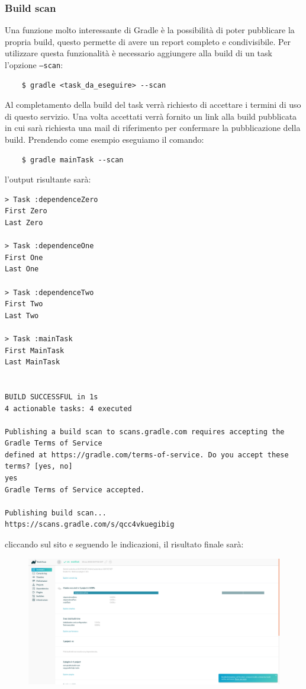 \subsubsection{Build scan}
Una funzione molto interessante di Gradle è la possibilità di poter pubblicare la propria build, questo permette di avere un report completo e condivisibile. Per utilizzare questa funzionalità è necessario aggiungere alla build di un task l'opzione \texttt{--scan}:
\begin{verbatim}    $ gradle <task_da_eseguire> --scan \end{verbatim}
Al completamento della build del task verrà richiesto di accettare i termini di uso di questo servizio. Una volta accettati verrà fornito un link alla build pubblicata in cui sarà richiesta una mail di riferimento per confermare la pubblicazione della build. Prendendo come esempio eseguiamo il comando:
\begin{verbatim}
    $ gradle mainTask --scan\end{verbatim}
l'output risultante sarà:
\begin{verbatim}
> Task :dependenceZero 
First Zero
Last Zero

> Task :dependenceOne 
First One
Last One

> Task :dependenceTwo 
First Two
Last Two

> Task :mainTask 
First MainTask
Last MainTask


BUILD SUCCESSFUL in 1s
4 actionable tasks: 4 executed

Publishing a build scan to scans.gradle.com requires accepting the Gradle Terms of Service 
defined at https://gradle.com/terms-of-service. Do you accept these terms? [yes, no] 
yes
Gradle Terms of Service accepted.

Publishing build scan...
https://scans.gradle.com/s/qcc4vkuegibig
\end{verbatim}
cliccando sul sito e seguendo le indicazioni, il risultato finale sarà:
\begin{figure}[H]
\includegraphics[scale=0.25]{HowToUse/1Task/insights/gradleScan.png}
\end{figure}